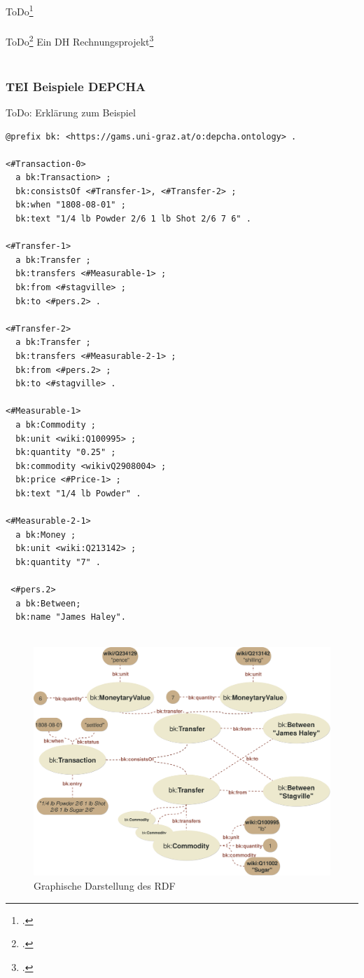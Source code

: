 \documentclass[12pt,a4paper]{article}
\begin{document}
ToDo\footcite[][S.9-12]{tomasekmedea}
\\
\\
ToDo\footcite[][S.101-109]{wurz2016dh}
Ein DH Rechnungsprojekt\footcite[][S.109-113]{wurz2016dh}
\\
\\


\subsubsection{TEI Beispiele DEPCHA}

ToDo: Erklärung zum Beispiel

\begin{lstlisting}[]
@prefix bk: <https://gams.uni-graz.at/o:depcha.ontology> .

<#Transaction-0>
  a bk:Transaction> ;
  bk:consistsOf <#Transfer-1>, <#Transfer-2> ;
  bk:when "1808-08-01" ;
  bk:text "1/4 lb Powder 2/6 1 lb Shot 2/6 7 6" .

<#Transfer-1>
  a bk:Transfer ;
  bk:transfers <#Measurable-1> ;
  bk:from <#stagville> ;
  bk:to <#pers.2> .

<#Transfer-2>
  a bk:Transfer ;
  bk:transfers <#Measurable-2-1> ;
  bk:from <#pers.2> ;
  bk:to <#stagville> .

<#Measurable-1>
  a bk:Commodity ;
  bk:unit <wiki:Q100995> ;
  bk:quantity "0.25" ;
  bk:commodity <wikivQ2908004> ;
  bk:price <#Price-1> ;
  bk:text "1/4 lb Powder" .

<#Measurable-2-1>
  a bk:Money ;
  bk:unit <wiki:Q213142> ;
  bk:quantity "7" .
  
 <#pers.2>
  a bk:Between;
  bk:name "James Haley".
  
\end{lstlisting}

\begin{figure}[H]
\centering
	\includegraphics[width=1\textwidth]{img/example.png}  
    \caption[Graphische Darstellung des RDF, eigene Darstellung, 01.06.2019.]{Graphische Darstellung des RDF} \label{fig:example}
\end{figure}
\end{document}
